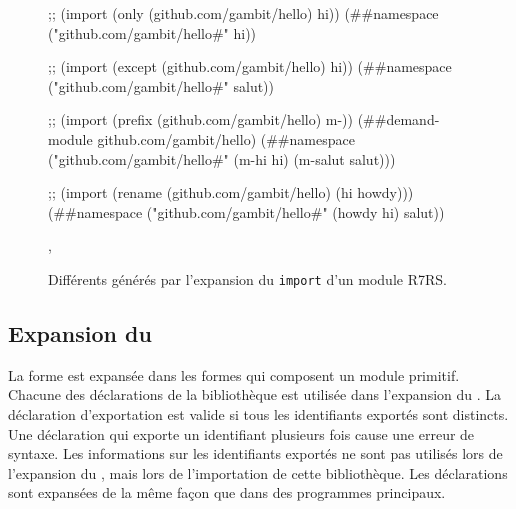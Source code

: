 \begin{figure}[ht]
  \centering
  \begin{mplisting}{1}
;; (import (only (github.com/gambit/hello) hi))
(##namespace ("github.com/gambit/hello#" hi))

;; (import (except (github.com/gambit/hello) hi))
(##namespace ("github.com/gambit/hello#" salut))

;; (import (prefix (github.com/gambit/hello) m-))
(##demand-module github.com/gambit/hello)
(##namespace ("github.com/gambit/hello#" (m-hi hi) (m-salut salut)))

;; (import (rename (github.com/gambit/hello) (hi howdy)))
(##namespace ("github.com/gambit/hello#" (howdy hi) salut))
\end{mplisting}
  \caption{Différents  générés par
    l'expansion du \texttt{import} d'un module R7RS.}
  \label{fig:import->expand-r7rs-namespace},
\end{figure}


\subsection{Expansion du }

La forme  est expansée dans les formes qui composent un
module primitif. Chacune des déclarations de la bibliothèque est utilisée dans
l'expansion du . La déclaration d'exportation est
valide si tous les identifiants exportés sont distincts. Une déclaration
 qui exporte un identifiant plusieurs fois cause une erreur de
syntaxe. Les informations sur les identifiants exportés ne sont pas utilisés lors de
l'expansion du , mais lors de l'importation de cette
bibliothèque.  Les déclarations  sont expansées de la même
façon que dans des programmes principaux.\\

